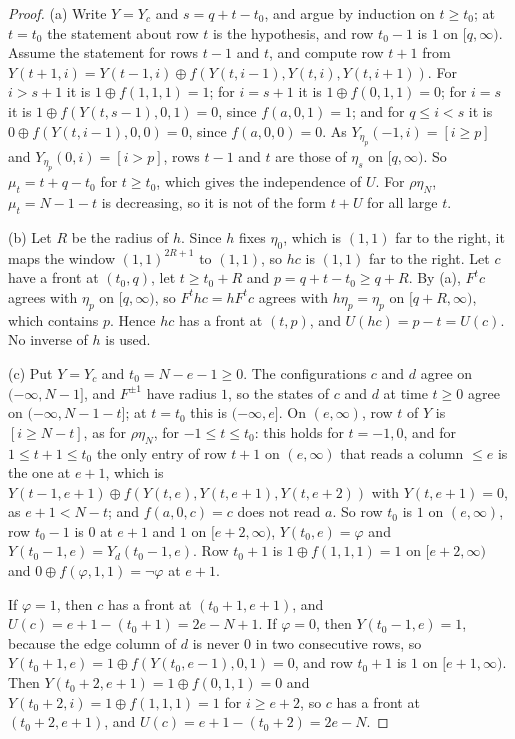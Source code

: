 \begin{proof}
(a) Write $Y=Y_c$ and $s=q+t-t_0$, and argue by induction on $t\ge t_0$; at $t=t_0$ the statement about row $t$ is the hypothesis, and row $t_0-1$ is $1$ on $[q,\infty)$. Assume the statement for rows $t-1$ and $t$, and compute row $t+1$ from $Y(t+1,i)=Y(t-1,i)\oplus f(Y(t,i-1),Y(t,i),Y(t,i+1))$. For $i>s+1$ it is $1\oplus f(1,1,1)=1$; for $i=s+1$ it is $1\oplus f(0,1,1)=0$; for $i=s$ it is $1\oplus f(Y(t,s-1),0,1)=0$, since $f(a,0,1)=1$; and for $q\le i<s$ it is $0\oplus f(Y(t,i-1),0,0)=0$, since $f(a,0,0)=0$. As $Y_{\eta_p}(-1,i)=[i\ge p]$ and $Y_{\eta_p}(0,i)=[i>p]$, rows $t-1$ and $t$ are those of $\eta_{s}$ on $[q,\infty)$. So $\mu_t=t+q-t_0$ for $t\ge t_0$, which gives the independence of $U$. For $\rho\eta_N$, $\mu_t=N-1-t$ is decreasing, so it is not of the form $t+U$ for all large $t$.

(b) Let $R$ be the radius of $h$. Since $h$ fixes $\eta_0$, which is $(1,1)$ far to the right, it maps the window $(1,1)^{2R+1}$ to $(1,1)$, so $hc$ is $(1,1)$ far to the right. Let $c$ have a front at $(t_0,q)$, let $t\ge t_0+R$ and $p=q+t-t_0\ge q+R$. By (a), $F^tc$ agrees with $\eta_p$ on $[q,\infty)$, so $F^thc=hF^tc$ agrees with $h\eta_p=\eta_p$ on $[q+R,\infty)$, which contains $p$. Hence $hc$ has a front at $(t,p)$, and $U(hc)=p-t=U(c)$. No inverse of $h$ is used.

(c) Put $Y=Y_c$ and $t_0=N-e-1\ge0$. The configurations $c$ and $d$ agree on $(-\infty,N-1]$, and $F^{\pm1}$ have radius $1$, so the states of $c$ and $d$ at time $t\ge0$ agree on $(-\infty,N-1-t]$; at $t=t_0$ this is $(-\infty,e]$. On $(e,\infty)$, row $t$ of $Y$ is $[i\ge N-t]$, as for $\rho\eta_N$, for $-1\le t\le t_0$: this holds for $t=-1,0$, and for $1\le t+1\le t_0$ the only entry of row $t+1$ on $(e,\infty)$ that reads a column $\le e$ is the one at $e+1$, which is $Y(t-1,e+1)\oplus f(Y(t,e),Y(t,e+1),Y(t,e+2))$ with $Y(t,e+1)=0$, as $e+1<N-t$; and $f(a,0,c)=c$ does not read $a$. So row $t_0$ is $1$ on $(e,\infty)$, row $t_0-1$ is $0$ at $e+1$ and $1$ on $[e+2,\infty)$, $Y(t_0,e)=\varphi$ and $Y(t_0-1,e)=Y_d(t_0-1,e)$. Row $t_0+1$ is $1\oplus f(1,1,1)=1$ on $[e+2,\infty)$ and $0\oplus f(\varphi,1,1)=\neg\varphi$ at $e+1$.

If $\varphi=1$, then $c$ has a front at $(t_0+1,e+1)$, and $U(c)=e+1-(t_0+1)=2e-N+1$. If $\varphi=0$, then $Y(t_0-1,e)=1$, because the edge column of $d$ is never $0$ in two consecutive rows, so $Y(t_0+1,e)=1\oplus f(Y(t_0,e-1),0,1)=0$, and row $t_0+1$ is $1$ on $[e+1,\infty)$. Then $Y(t_0+2,e+1)=1\oplus f(0,1,1)=0$ and $Y(t_0+2,i)=1\oplus f(1,1,1)=1$ for $i\ge e+2$, so $c$ has a front at $(t_0+2,e+1)$, and $U(c)=e+1-(t_0+2)=2e-N$.
\end{proof}

